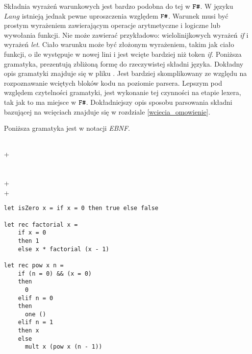 \documentclass[declaration,shortabstract]{iithesis}
\begin{document}
Składnia wyrażeń warunkowych jest bardzo podobna do tej w $\verb!F#!$. W języku $Lang$
istnieją jednak pewne uproszczenia względem $\verb!F#!$. 
Warunek musi być prostym wyrażeniem zawierającym operacje arytmetyczne i logiczne
lub wywołania funkcji. Nie może zawierać przykładowo: wielolinijkowych wyrażeń
\textit{if} i wyrażeń \textit{let}. Ciało warunku może być złożonym wyrażeniem, takim jak 
ciało funkcji, o ile występuje w nowej lini i jest wcięte bardziej niż 
token \textit{if}. 
Poniższa gramatyka, prezentują zbliżoną formę do rzeczywistej składni języka.
Dokładny opis gramatyki znajduje się w pliku 
. Jest bardziej skomplikowany
ze względu na rozpoznawanie wciętych bloków kodu na
poziomie parsera. Lepszym pod względem czytelności gramatyki, 
jest wykonanie tej czynności na etapie lexera, tak jak to ma miejsce w $\verb!F#!$. Dokładniejszy opis 
sposobu parsowania składni bazującej na wcięciach znajduje się w rozdziale \ref{wciecia_omowienie}. 

Poniższa gramatyka jest w notacji \textit{EBNF}.

\begin{bnf*}
    {     
       
    }\\
    {     
      + \ast {}
    }\\
    {  \bnfor \bnfes}\\
    {    \bnfor \bnfes}\\
    { + \bnfor {} 
     \bnfor \bnfes}\\
    { + \bnfor {} 
     \bnfor \bnfes}\\
    {}
\end{bnf*}

\begin{lstlisting}[frame=single, caption=Przykłady wyrażeń warunkowych.]
let isZero x = if x = 0 then true else false

let rec factorial x = 
    if x = 0 
    then 1 
    else x * factorial (x - 1)

let rec pow x n = 
    if (n = 0) && (x = 0)
    then 
      0 
    elif n = 0 
    then 
      one ()
    elif n = 1 
    then x
    else 
      mult x (pow x (n - 1))
\end{lstlisting}
\end{document}
